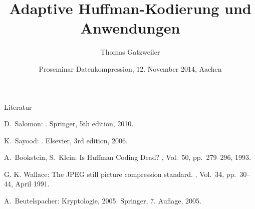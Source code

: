 \documentclass[xcolor=dvipsnames,presentation]{beamer}    %
\title[Huffman-Kodierung]{Adaptive Huffman-Kodierung und Anwendungen}
\author[Gatzweiler]{Thomas Gatzweiler}
\institute[RWTH Aachen University] %
{
  \strut Human Language Technology and Pattern Recognition\\
  \strut Computer Science Department, RWTH Aachen University %
}
\date[12. November 2014]{Proseminar Datenkompression, 12. November 2014, Aachen}
\begin{document}
\nocite{*}

\begin{frame}[label=titlepage]
  \titlepage
\end{frame}


%




\begin{frame}[fragile]{Literatur}

  \begin{thebibliography}{}

D.~Salomon:
.
\newblock Springer, 5th edition, 2010.

K.~Sayood:
.
\newblock Elsevier, 3rd edition, 2006.

A.~Bookstein, S.~Klein: \newblock Is Huffman Coding Dead?
, Vol.~50, pp.~279--296, 1993.

G. K. Wallace: \newblock The {JPEG} still picture compression standard.
, Vol.~34, pp.~30--44, April 1991.

A.~Beutelspacher: \newblock Kryptologie, 2005.
\newblock Springer, 7. Auflage, 2005.
\end{thebibliography}

\end{frame}
\end{document}
